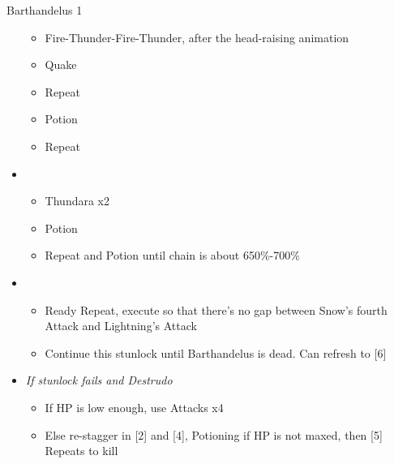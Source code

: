 \begin{battle}{Barthandelus 1}
\begin{multicols}{2}
\begin{itemize}
\begin{itemize}
        \item Fire-Thunder-Fire-Thunder, after the head-raising animation
        \item Quake
        \item Repeat
        \item Potion
        \item Repeat
    \end{itemize}
    \item \fourth
    \begin{itemize}
        \item Thundara x2
        \item Potion
        \item Repeat and Potion until chain is about 650\%-700\%
    \end{itemize}
    \item \fifth
    \begin{itemize}
        \item Ready Repeat, execute so that there's no gap between Snow's fourth Attack and Lightning's Attack
        \item Continue this stunlock until Barthandelus is dead. Can refresh to [6]
    \end{itemize}
    \item \textit{If stunlock fails and Destrudo}
    \begin{itemize}
        \item If HP is low enough, use Attacks x4
        \item Else re-stagger in [2] and [4], Potioning if HP is not maxed, then [5] Repeats to kill
    \end{itemize}
\end{itemize}
\end{multicols}
\end{battle}
